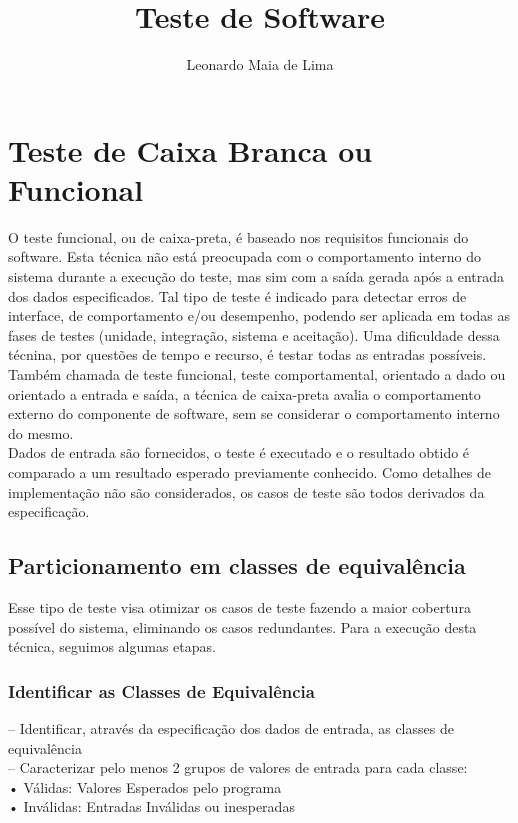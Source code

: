 \documentclass[12pt]{article}%
\begin{document}
\title{Teste de Software}
\author{Leonardo Maia de Lima}
\maketitle
\section{Teste de Caixa Branca ou Funcional}

O teste funcional, ou de caixa-preta, é baseado nos requisitos funcionais do software. Esta técnica não está preocupada com o comportamento interno do sistema durante a execução do teste, mas sim com a saída gerada após a entrada dos dados especificados. Tal tipo de teste é indicado para detectar erros de interface, de comportamento e/ou desempenho, podendo ser aplicada em todas as fases de testes (unidade, integração, sistema e aceitação). Uma dificuldade dessa técnina, por questões de tempo e recurso, é testar todas as entradas possíveis.
Também chamada de teste funcional, teste comportamental, orientado a dado ou orientado a entrada e saída, a técnica de caixa-preta avalia o comportamento externo do componente de software, sem se considerar o comportamento interno do mesmo.\\ Dados de entrada são fornecidos, o teste é executado e o resultado obtido é comparado a um resultado esperado previamente conhecido. Como detalhes de implementação não são considerados, os casos de teste são todos derivados da especificação.
 

\subsection{Particionamento em classes de equivalência}
Esse tipo de teste visa otimizar os casos de teste fazendo a maior cobertura possível do sistema, eliminando os casos redundantes. Para a execução desta técnica, seguimos algumas etapas.
\subsubsection{Identificar as Classes de Equivalência}
– Identificar, através da especificação dos dados de entrada, as classes de equivalência \\
– Caracterizar pelo menos 2 grupos de valores de entrada para cada classe: \\
\indent • Válidas: Valores Esperados pelo programa \\
\indent • Inválidas: Entradas Inválidas ou inesperadas
\end{document}

